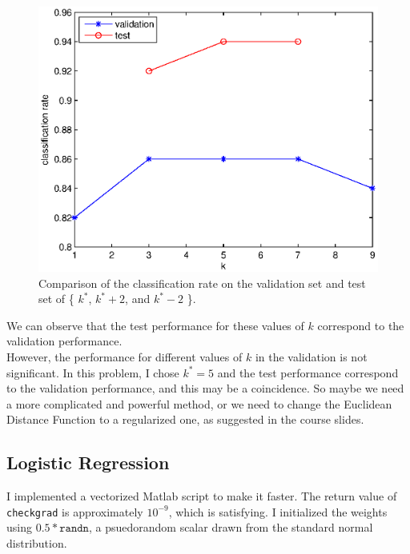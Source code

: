 \documentclass{article}
\begin{document}
\begin{figure}[ht]
\centering
\includegraphics[width=\textwidth]{kstarnn.eps}
\caption{Comparison of the classification rate on the validation set and test set of \{ $k^*$, $k^*+2$, and $k^*-2$ \}. 
\label{fig:kstarnn}}
\end{figure}


We can observe that the test performance for these values of $k$ correspond to the validation performance. \\

However, the performance for different values of $k$ in the validation is not significant. In this problem, I chose $k^* = 5$ and the test performance correspond to the validation performance, and this may be a coincidence. So maybe we need a more complicated and powerful method, or we need to change the Euclidean Distance Function to a regularized one, as suggested in the course slides.\\

\subsection{Logistic Regression}

I implemented a vectorized Matlab script to make it faster. The return value of \texttt{checkgrad} is approximately $10^{-9}$, which is satisfying. I initialized the weights using $0.5 * \texttt{randn}$, a psuedorandom scalar drawn from the standard normal distribution. \\
\end{document}
